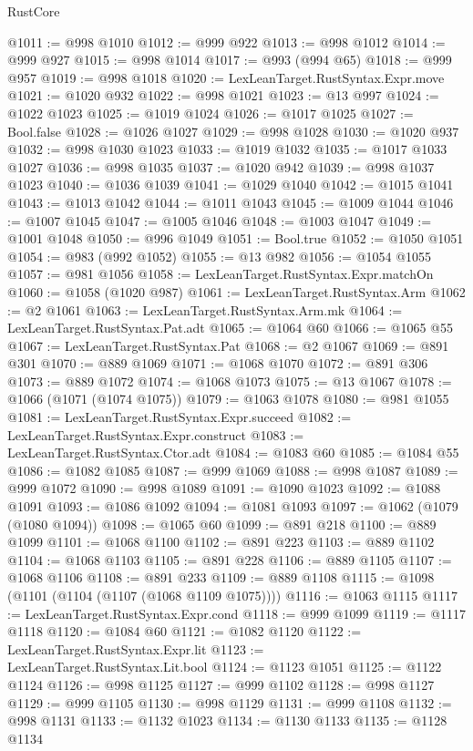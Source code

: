 \begin{lexlean}{RustCore}
\begin{coremodule}
@1011 := @998 @1010
@1012 := @999 @922
@1013 := @998 @1012
@1014 := @999 @927
@1015 := @998 @1014
@1017 := @993 (@994 @65)
@1018 := @999 @957
@1019 := @998 @1018
@1020 := LexLeanTarget.RustSyntax.Expr.move
@1021 := @1020 @932
@1022 := @998 @1021
@1023 := @13 @997
@1024 := @1022 @1023
@1025 := @1019 @1024
@1026 := @1017 @1025
@1027 := Bool.false
@1028 := @1026 @1027
@1029 := @998 @1028
@1030 := @1020 @937
@1032 := @998 @1030 @1023
@1033 := @1019 @1032
@1035 := @1017 @1033 @1027
@1036 := @998 @1035
@1037 := @1020 @942
@1039 := @998 @1037 @1023
@1040 := @1036 @1039
@1041 := @1029 @1040
@1042 := @1015 @1041
@1043 := @1013 @1042
@1044 := @1011 @1043
@1045 := @1009 @1044
@1046 := @1007 @1045
@1047 := @1005 @1046
@1048 := @1003 @1047
@1049 := @1001 @1048
@1050 := @996 @1049
@1051 := Bool.true
@1052 := @1050 @1051
@1054 := @983 (@992 @1052)
@1055 := @13 @982
@1056 := @1054 @1055
@1057 := @981 @1056
@1058 := LexLeanTarget.RustSyntax.Expr.matchOn
@1060 := @1058 (@1020 @987)
@1061 := LexLeanTarget.RustSyntax.Arm
@1062 := @2 @1061
@1063 := LexLeanTarget.RustSyntax.Arm.mk
@1064 := LexLeanTarget.RustSyntax.Pat.adt
@1065 := @1064 @60
@1066 := @1065 @55
@1067 := LexLeanTarget.RustSyntax.Pat
@1068 := @2 @1067
@1069 := @891 @301
@1070 := @889 @1069
@1071 := @1068 @1070
@1072 := @891 @306
@1073 := @889 @1072
@1074 := @1068 @1073
@1075 := @13 @1067
@1078 := @1066 (@1071 (@1074 @1075))
@1079 := @1063 @1078
@1080 := @981 @1055
@1081 := LexLeanTarget.RustSyntax.Expr.succeed
@1082 := LexLeanTarget.RustSyntax.Expr.construct
@1083 := LexLeanTarget.RustSyntax.Ctor.adt
@1084 := @1083 @60
@1085 := @1084 @55
@1086 := @1082 @1085
@1087 := @999 @1069
@1088 := @998 @1087
@1089 := @999 @1072
@1090 := @998 @1089
@1091 := @1090 @1023
@1092 := @1088 @1091
@1093 := @1086 @1092
@1094 := @1081 @1093
@1097 := @1062 (@1079 (@1080 @1094))
@1098 := @1065 @60
@1099 := @891 @218
@1100 := @889 @1099
@1101 := @1068 @1100
@1102 := @891 @223
@1103 := @889 @1102
@1104 := @1068 @1103
@1105 := @891 @228
@1106 := @889 @1105
@1107 := @1068 @1106
@1108 := @891 @233
@1109 := @889 @1108
@1115 := @1098 (@1101 (@1104 (@1107 (@1068 @1109 @1075))))
@1116 := @1063 @1115
@1117 := LexLeanTarget.RustSyntax.Expr.cond
@1118 := @999 @1099
@1119 := @1117 @1118
@1120 := @1084 @60
@1121 := @1082 @1120
@1122 := LexLeanTarget.RustSyntax.Expr.lit
@1123 := LexLeanTarget.RustSyntax.Lit.bool
@1124 := @1123 @1051
@1125 := @1122 @1124
@1126 := @998 @1125
@1127 := @999 @1102
@1128 := @998 @1127
@1129 := @999 @1105
@1130 := @998 @1129
@1131 := @999 @1108
@1132 := @998 @1131
@1133 := @1132 @1023
@1134 := @1130 @1133
@1135 := @1128 @1134

\end{coremodule}
\end{lexlean}
